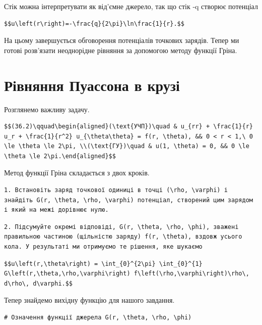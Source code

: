 \documentclass[
  ukrainian,
]{article}
\begin{document}
Стік можна інтерпретувати як від'ємне джерело, так що стік -q створює
потенціал

\begin{verbatim}
$$u\left(r\right)=-\frac{q}{2\pi}\ln\frac{1}{r}.$$
\end{verbatim}

На цьому завершується обговорення потенціалів точкових зарядів. Тепер ми
готові розв'язати неоднорідне рівняння за допомогою методу функції
Гріна.

\section{Рівняння Пуассона в
крузі}\label{ux440ux456ux432ux43dux44fux43dux43dux44f-ux43fux443ux430ux441ux441ux43eux43dux430-ux432-ux43aux440ux443ux437ux456}

Розглянемо важливу задачу.

\begin{verbatim}
$$(36.2)\qquad\begin{aligned}(\text{УЧП})\quad & u_{rr} + \frac{1}{r} u_r + \frac{1}{r^2} u_{\theta\theta} = f(r, \theta), && 0 < r < 1,\ 0 \le \theta \le 2\pi, \\(\text{ГУ})\quad & u(1, \theta) = 0, && 0 \le \theta \le 2\pi.\end{aligned}$$
\end{verbatim}

Метод функції Гріна складається з двох кроків.

\begin{verbatim}
1. Встановіть заряд точкової одиниці в точці (\rho, \varphi) і знайдіть G(r, \theta, \rho, \varphi) потенціал, створений цим зарядом і який на межі дорівнює нулю.
\end{verbatim}

\begin{verbatim}
2. Підсумуйте окремі відповіді, G(r, \theta, \rho, \phi), зважені правильною частиною (щільністю заряду) f(r, \theta), вздовж усього кола. У результаті ми отримуємо те рішення, яке шукаємо
\end{verbatim}

\begin{verbatim}
$$u\left(r,\theta\right) = \int_{0}^{2\pi} \int_{0}^{1} G\left(r,\theta,\rho,\varphi\right) f\left(\rho,\varphi\right)\rho\, d\rho\, d\varphi.$$
\end{verbatim}

Тепер знайдемо вихідну функцію для нашого завдання.

\begin{verbatim}
# Означення функції джерела G(r, \theta, \rho, \phi)
\end{verbatim}
\end{document}
